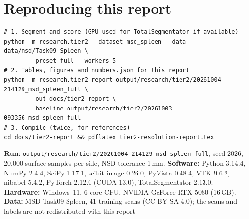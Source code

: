 \documentclass[10pt,a4paper]{article}
\begin{document}
\appendix
\section{Reproducing this report}
\begin{small}
\begin{verbatim}
# 1. Segment and score (GPU used for TotalSegmentator if available)
python -m research.tier2 --dataset msd_spleen --data data/msd/Task09_Spleen \
       --preset full --workers 5
# 2. Tables, figures and numbers.json for this report
python -m research.tier2_report output/research/tier2/20261004-214129_msd_spleen_full \
       --out docs/tier2-report \
       --baseline output/research/tier2/20261003-093356_msd_spleen_full
# 3. Compile (twice, for references)
cd docs/tier2-report && pdflatex tier2-resolution-report.tex
\end{verbatim}
\end{small}

\textbf{Run:} \texttt{output/research/tier2/20261004-214129\_msd\_spleen\_full}, seed 2026, 20{,}000 surface samples per side, NSD tolerance 1\,mm. \textbf{Software:} Python 3.14.4, NumPy 2.4.4, SciPy 1.17.1, scikit-image 0.26.0, PyVista 0.48.4, VTK 9.6.2, nibabel 5.4.2, PyTorch 2.12.0 (CUDA 13.0), TotalSegmentator 2.13.0. \textbf{Hardware:} Windows~11, 6-core CPU, NVIDIA GeForce RTX 5080 (16\,GB). \textbf{Data:} MSD Task09 Spleen, 41 training scans (CC-BY-SA 4.0); the scans and labels are not redistributed with this report.
\end{document}
